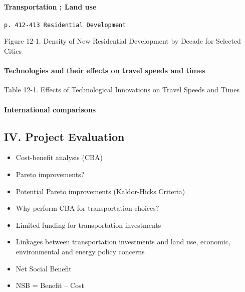 \documentclass[]{article}
\let\oldparagraph\paragraph
\renewcommand{\paragraph}[1]{\oldparagraph{#1}\mbox{}}
\begin{document}
\hypertarget{transportation-land-use-1}{%
\paragraph{Transportation ; Land use}\label{transportation-land-use-1}}

\texttt{p.\ 412-413\ Residential\ Development}

Figure 12-1. Density of New Residential Development by Decade for
Selected Cities

\hypertarget{technologies-and-their-effects-on-travel-speeds-and-times}{%
\paragraph{Technologies and their effects on travel speeds and
times}\label{technologies-and-their-effects-on-travel-speeds-and-times}}

Table 12-1. Effects of Technological Innovations on Travel Speeds and
Times

\hypertarget{international-comparisons}{%
\paragraph{International comparisons}\label{international-comparisons}}

\hypertarget{iv.-project-evaluation}{%
\subsection{IV. Project Evaluation}\label{iv.-project-evaluation}}

\begin{itemize}
\item
  Cost-benefit analysis (CBA)
\item
  Pareto improvements?
\item
  Potential Pareto improvements (Kaldor-Hicks Criteria)
\item
  Why perform CBA for transportation choices?
\item
  Limited funding for transportation investments
\item
  Linkages between transportation investments and land use, economic,
  environmental and energy policy concerns
\item
  Net Social Benefit
\item
  NSB = Benefit -- Cost
\end{itemize}
\end{document}
